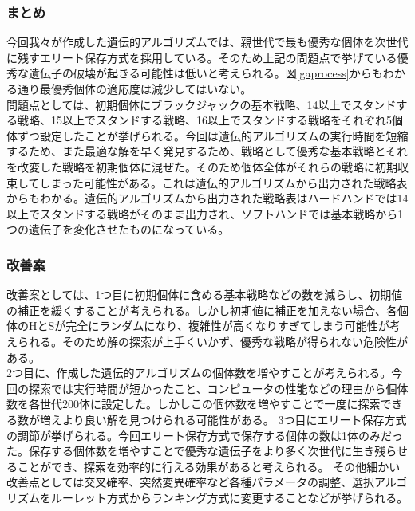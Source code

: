 \subsubsection{まとめ}
今回我々が作成した遺伝的アルゴリズムでは、親世代で最も優秀な個体を次世代に残すエリート保存方式を採用している。そのため上記の問題点で挙げている優秀な遺伝子の破壊が起きる可能性は低いと考えられる。図\ref{gaprocess}からもわかる通り最優秀個体の適応度は減少してはいない。\\
問題点としては、初期個体にブラックジャックの基本戦略、14以上でスタンドする戦略、15以上でスタンドする戦略、16以上でスタンドする戦略をそれぞれ5個体ずつ設定したことが挙げられる。今回は遺伝的アルゴリズムの実行時間を短縮するため、また最適な解を早く発見するため、戦略として優秀な基本戦略とそれを改変した戦略を初期個体に混ぜた。そのため個体全体がそれらの戦略に初期収束してしまった可能性がある。これは遺伝的アルゴリズムから出力された戦略表からもわかる。遺伝的アルゴリズムから出力された戦略表はハードハンドでは14以上でスタンドする戦略がそのまま出力され、ソフトハンドでは基本戦略から1つの遺伝子を変化させたものになっている。


\subsubsection{改善案}
改善案としては、1つ目に初期個体に含める基本戦略などの数を減らし、初期値の補正を緩くすることが考えられる。しかし初期値に補正を加えない場合、各個体のHとSが完全にランダムになり、複雑性が高くなりすぎてしまう可能性が考えられる。そのため解の探索が上手くいかず、優秀な戦略が得られない危険性がある。\\
2つ目に、作成した遺伝的アルゴリズムの個体数を増やすことが考えられる。今回の探索では実行時間が短かったこと、コンピュータの性能などの理由から個体数を各世代200体に設定した。しかしこの個体数を増やすことで一度に探索できる数が増えより良い解を見つけられる可能性がある。
3つ目にエリート保存方式の調節が挙げられる。今回エリート保存方式で保存する個体の数は1体のみだった。保存する個体数を増やすことで優秀な遺伝子をより多く次世代に生き残らせることができ、探索を効率的に行える効果があると考えられる。
その他細かい改善点としては交叉確率、突然変異確率など各種パラメータの調整、選択アルゴリズムをルーレット方式からランキング方式に変更することなどが挙げられる。
